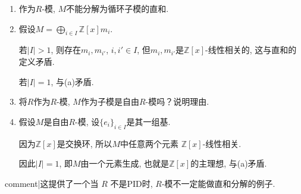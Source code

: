 \begin{enumerate}
    \item[(b)] 作为$R$-模, $M$不能分解为循环子模的直和.
    \item[\textbf{证明:}]
        假设$M=\bigoplus\limits_{i\in I} \mathbb{Z}[x]m_i$.\par
        若$|I|>1$, 则存在$m_{i}, m_{i'}$, $i, i'\in I$, 
        但$m_{i}, m_{i'}$是$\mathbb{Z}[x]$-线性相关的, 这与直和的定义矛盾.\par
        若$|I|=1$, 与(a)矛盾.
            
    \item[(c)] 将$R$作为$R$-模, $M$作为子模是自由$R$-模吗？说明理由.
    \item[\textbf{证明:}]
        假设$M$是自由$R$-模, 设$\{e_i\}_{i\in I}$是其一组基.\par
        因为$\mathbb{Z}[x]$是交换环, 所以$M$中任意两个元素
        $\mathbb{Z}[x]$-线性相关.\par
        因此$|I|=1$, 即$M$由一个元素生成, 
        也就是$\mathbb{Z}[x]$的主理想, 与(a)矛盾.
    \end{enumerate}
    {{comment|这提供了一个当 $R$ 不是PID时, $R$-模不一定能做直和分解的例子.}}
    
